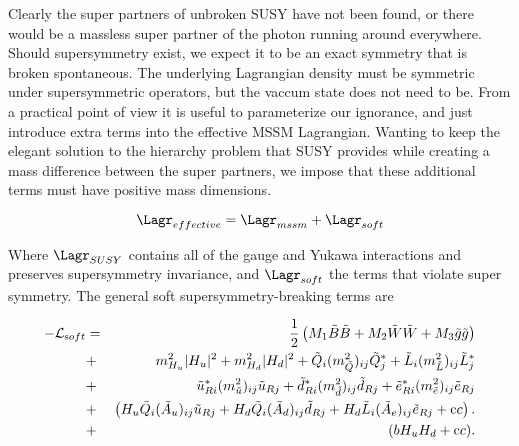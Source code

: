 Clearly the super partners of unbroken SUSY have not been found, or there would be a massless super partner of the photon running around everywhere. Should supersymmetry exist, we expect it to be an exact symmetry that is broken spontaneous. The underlying Lagrangian density must be symmetric under supersymmetric operators, but the vaccum state does not need to be. From a practical point of view it is useful to parameterize our ignorance, and just introduce extra terms into the effective MSSM Lagrangian.  Wanting to keep the elegant solution to the hierarchy problem that SUSY provides while creating a mass difference between the super partners, we impose that these additional terms must have positive mass dimensions. 

\begin{equation*}
    \Lagr_{effective} = \Lagr_{mssm} + \Lagr_{soft}
\end{equation*}

Where $\Lagr_{SUSY}$ contains all of the gauge and Yukawa interactions and preserves supersymmetry invariance, and $\Lagr_{soft}$ the terms that violate super symmetry. The general soft supersymmetry-breaking terms are

    
    
    

\begin{eqnarray}
-\mathcal{L}_{\textrm soft} &=& \frac{1}{2} \left (M_1 \tilde{B}\tilde{B} +M_2 \tilde{W}\tilde{W}+M_3 \tilde{g}\tilde{g} \right )\nonumber \\
&+& m^2_{H_u} \vert H_u\vert^2 + m^2_{H_d} \vert H_d\vert^2+\tilde{Q}_i (m^2_{\tilde{Q}})_{ij} \tilde{Q}_j^* +\tilde{L}_i (m^2_{\tilde{L}})_{ij} \tilde{L}_j^*\nonumber \\ &+& \tilde{u}_{Ri}^* (m^2_{\tilde{u}})_{ij} \tilde{u}_{Rj} + \tilde{d}_{Ri}^* (m^2_{\tilde{d}})_{ij} \tilde{d}_{Rj} + \tilde{e}_{Ri}^* (m^2_{\tilde{e}})_{ij} \tilde{e}_{Rj} \nonumber \\ &+& \left ( H_u \tilde{Q}_i (\tilde{A}_u)_{ij} \tilde{u}_{Rj}+  H_d \tilde{Q}_i (\tilde{A}_d)_{ij} \tilde{d}_{Rj}+ H_d \tilde{L}_i (\tilde{A}_e)_{ij} \tilde{e}_{Rj}+{\textrm cc} \right ).\nonumber \\
 &+&(b H_u H_d+{\textrm cc} ).
 \label{Lsoft}
\end{eqnarray}

